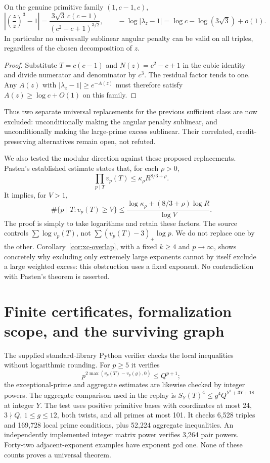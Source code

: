 \begin{proposition}
\label{prop:xc-imbalance}
On the genuine primitive family $(1,c-1,c)$,
\[
 \left|\left(\frac z{\bar z}\right)^3-1\right|
 =\frac{3\sqrt3\,c(c-1)}{(c^2-c+1)^{3/2}},\qquad
 -\log|\lambda_z-1|=\log c-\log(3\sqrt3)+o(1).
\]
In particular no universally sublinear angular penalty can be valid on all
triples, regardless of the chosen decomposition of $z$.
\end{proposition}
\begin{proof}
Substitute $T=c(c-1)$ and $N(z)=c^2-c+1$ in the cubic identity and divide
numerator and denominator by $c^3$. The residual factor tends to one.
Any $A(z)$ with $|\lambda_z-1|\ge e^{-A(z)}$ must therefore satisfy
$A(z)\ge\log c+O(1)$ on this family.
\end{proof}

Thus two separate universal replacements for the previous sufficient class
are now excluded: unconditionally making the angular penalty sublinear,
and unconditionally making the large-prime excess sublinear. Their
correlated, credit-preserving alternatives remain open, not refuted.

We also tested the modular direction against these proposed replacements.
Pasten's established estimate \cite[Theorem~2.5]{XC-Pasten} states that,
for each $\rho>0$,
\[
 \prod_{p\mid T}v_p(T)\le\kappa_\rho R^{8/3+\rho}.
\]
It implies, for $V>1$,
\begin{equation}\label{eq:xc-pasten-count}
 \#\{p\mid T:v_p(T)\ge V\}
 \le\frac{\log\kappa_\rho+(8/3+\rho)\log R}{\log V}.
\end{equation}
The proof is simply to take logarithms and retain these factors.
The source controls $\sum\log v_p(T)$, not
$\sum(v_p(T)-3)_+\log p$. We do not replace one by the other.
Corollary~\ref{cor:xc-overlap}, with a fixed $k\ge4$ and $p\to\infty$,
shows concretely why excluding only extremely large exponents cannot by
itself exclude a large weighted excess: this obstruction uses a fixed
exponent. No contradiction with Pasten's theorem is asserted.

\section{Finite certificates, formalization scope, and the surviving graph}
\label{sec:xc-validation}
The supplied standard-library Python verifier checks the local inequalities
without logarithmic rounding. For $p\ge5$ it verifies
\[
 p^{2\max(v_p(T)-v_p(g),0)}\le Q^{p+1};
\]
the exceptional-prime and aggregate estimates are likewise checked by
integer powers. The aggregate comparison used in the replay is
$S_Y(T)^4\le g^4Q^{Y^2+3Y+18}$ at integer $Y$.
The test uses positive primitive bases with coordinates at most 24,
$3\nmid Q$, $1\le g\le12$, both twists, and all primes at most 101.
It checks 6,528 triples and 169,728 local prime conditions, plus
52,224 aggregate inequalities. An independently implemented integer matrix
power verifies 3,264 pair powers. Forty-two adjacent-exponent examples have
exponent gcd one. None of these counts proves a universal theorem.


